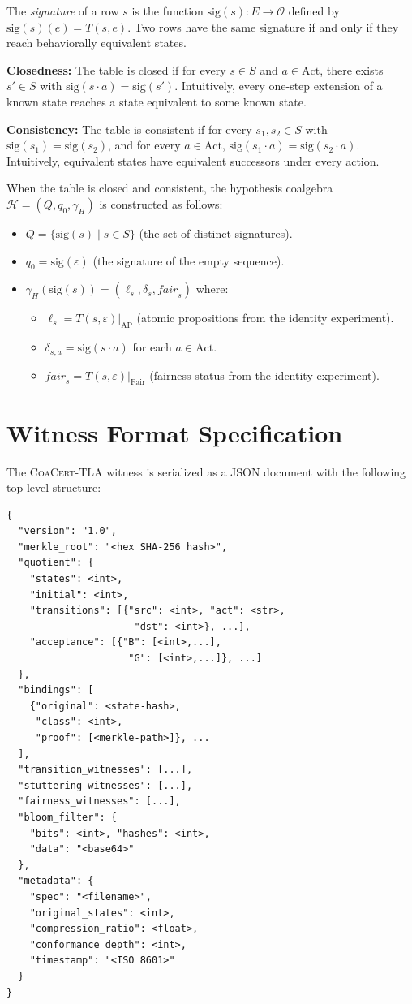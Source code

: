 \documentclass[11pt]{article}
\newcommand{\Fair}{\ensuremath{\mathrm{Fair}}}
\newcommand{\Act}{\ensuremath{\mathrm{Act}}}
\newcommand{\AP}{\ensuremath{\mathrm{AP}}}
\newcommand{\CoaCert}{\textsc{CoaCert-TLA}}
\begin{document}
The \emph{signature} of a row $s$ is the function $\mathrm{sig}(s) : E \to \mathcal{O}$
defined by $\mathrm{sig}(s)(e) = T(s, e)$.
Two rows have the same signature if and only if they reach behaviorally
equivalent states.

\textbf{Closedness:} The table is closed if for every $s \in S$ and
$a \in \Act$, there exists $s' \in S$ with $\mathrm{sig}(s \cdot a) = \mathrm{sig}(s')$.
Intuitively, every one-step extension of a known state reaches a state
equivalent to some known state.

\textbf{Consistency:} The table is consistent if for every $s_1, s_2 \in S$
with $\mathrm{sig}(s_1) = \mathrm{sig}(s_2)$, and for every $a \in \Act$,
$\mathrm{sig}(s_1 \cdot a) = \mathrm{sig}(s_2 \cdot a)$.
Intuitively, equivalent states have equivalent successors under every action.

When the table is closed and consistent, the hypothesis coalgebra
$\mathcal{H} = (Q, q_0, \gamma_H)$ is constructed as follows:
\begin{itemize}[nosep]
\item $Q = \{\mathrm{sig}(s) \mid s \in S\}$ (the set of distinct signatures).
\item $q_0 = \mathrm{sig}(\varepsilon)$ (the signature of the empty sequence).
\item $\gamma_H(\mathrm{sig}(s)) = (\ell_s, \delta_s, \mathit{fair}_s)$ where:
  \begin{itemize}[nosep]
  \item $\ell_s = T(s, \varepsilon)|_{\AP}$ (atomic propositions from the
    identity experiment).
  \item $\delta_{s,a} = \mathrm{sig}(s \cdot a)$ for each $a \in \Act$.
  \item $\mathit{fair}_s = T(s, \varepsilon)|_{\Fair}$ (fairness status from
    the identity experiment).
  \end{itemize}
\end{itemize}

\section{Witness Format Specification}
\label{app:witness}

The \CoaCert{} witness is serialized as a JSON document with the following
top-level structure:

\begin{lstlisting}[language={}]
{
  "version": "1.0",
  "merkle_root": "<hex SHA-256 hash>",
  "quotient": {
    "states": <int>,
    "initial": <int>,
    "transitions": [{"src": <int>, "act": <str>,
                      "dst": <int>}, ...],
    "acceptance": [{"B": [<int>,...],
                     "G": [<int>,...]}, ...]
  },
  "bindings": [
    {"original": <state-hash>,
     "class": <int>,
     "proof": [<merkle-path>]}, ...
  ],
  "transition_witnesses": [...],
  "stuttering_witnesses": [...],
  "fairness_witnesses": [...],
  "bloom_filter": {
    "bits": <int>, "hashes": <int>,
    "data": "<base64>"
  },
  "metadata": {
    "spec": "<filename>",
    "original_states": <int>,
    "compression_ratio": <float>,
    "conformance_depth": <int>,
    "timestamp": "<ISO 8601>"
  }
}
\end{lstlisting}
\end{document}
